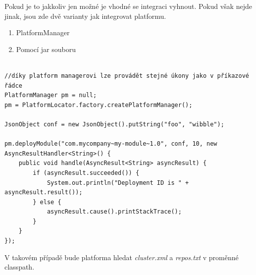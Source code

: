 Pokud je to jakkoliv jen možné je vhodné se integraci vyhnout. Pokud však nejde jinak, jsou zde dvě varianty jak integrovat platformu.

\begin{enumerate}
\item PlatformManager
\item Pomocí jar souboru
\end{enumerate}

\begin{lstlisting}[caption=Integrace do stávající Java aplikace]

//díky platform managerovi lze provádět stejné úkony jako v příkazové řádce
PlatformManager pm = null;
pm = PlatformLocator.factory.createPlatformManager();

JsonObject conf = new JsonObject().putString("foo", "wibble");

pm.deployModule("com.mycompany~my-module~1.0", conf, 10, new AsyncResultHandler<String>() {
    public void handle(AsyncResult<String> asyncResult) {
        if (asyncResult.succeeded()) {
            System.out.println("Deployment ID is " + asyncResult.result());
        } else {
            asyncResult.cause().printStackTrace();
        }
    }
});
\end{lstlisting}

V takovém případě bude platforma hledat \emph{cluster.xml} a \emph{repos.txt} v proměnné classpath.